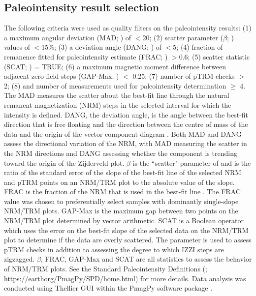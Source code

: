 \documentclass[9pt,twocolumn,twoside,lineno]{pnas-new}
\begin{document}
{\subsection*{Paleointensity result selection}
The following criteria were used as quality filters on the paleointensity results: (1) a maximum angular deviation (MAD;  \citealp{Kirschvink1980a}) of $<$20\textdegree; (2) scatter parameter ($\beta$;  \citealp{Coe1978a}) values of $<$15$\%$; (3) a deviation angle (DANG;  \citealp{Tauxe2004a}) of $<$5\textdegree; (4) fraction of remanence fitted for paleointensity estimate (FRAC;  \cite{Shaar2013a}) $>$0.6; (5) scatter statistic (SCAT;  \citealp{Shaar2013a}) = TRUE; (6) a maximum magnetic moment difference between adjacent zero-field steps (GAP-Max;  \citealp{Shaar2013a}) $<$ 0.25; (7) number of pTRM checks $>$ 2; (8) and number of measurements used for paleointensity determination $\geq$ 4. The MAD measures the scatter about the best-fit line through the natural remanent magnetization (NRM) steps in the selected interval for which the intensity is defined. DANG, the deviation angle, is the angle between the best-fit direction that is free floating and the direction between the centre of mass of the data and the origin of the vector component diagram \cite{Tauxe2004a}. Both MAD and DANG assess the directional variation of the NRM, with MAD measuring the scatter in the NRM directions and DANG assessing whether the component is trending toward the origin of the Zijderveld plot. $\beta$ is the ``scatter" parameter of  \cite{Coe1978a} and is the ratio of the standard error of the slope of the best-fit line of the selected NRM and pTRM points on an NRM/TRM plot to the absolute value of the slope. FRAC is the fraction of the NRM that is used in the best-fit line \cite{Shaar2013a}. The FRAC value was chosen to preferentially select samples with dominantly single-slope NRM/TRM plots. GAP-Max is the maximum gap between two points on the NRM/TRM plot determined by vector arithmetic. SCAT is a Boolean operator which uses the error on the best-fit slope of the selected data on the NRM/TRM plot to determine if the data are overly scattered. The parameter is used to assess pTRM checks in addition to assessing the degree to which IZZI steps are zigzagged. $\beta$, FRAC, GAP-Max and SCAT are all statistics to assess the behavior of NRM/TRM plots. See the Standard Paleointensity Definitions (\citealp{Paterson2014a}; \url{https://earthorg/PmagPy/SPD/home.html}) for more details. Data analysis was conducted using Thellier GUI \cite{Shaar2013a} within the PmagPy software package \cite{Tauxe2016a}.

}
\end{document}
